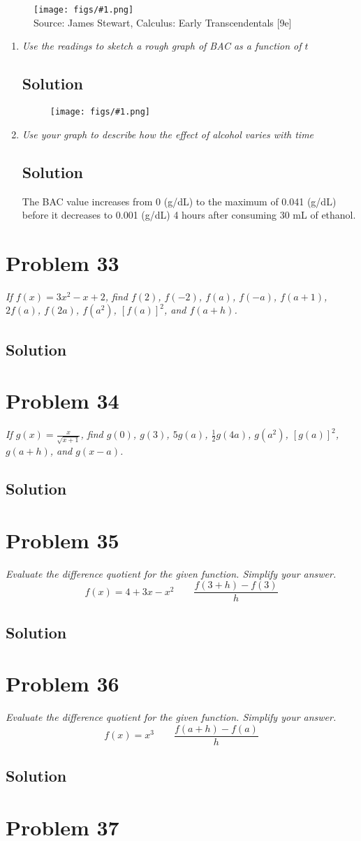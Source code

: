 \documentclass[11pt]{article}
\newcommand{\soln}{\subsection*}
\newcommand{\qn}{\textit}
\newcommand{\imagesource}[1]{{\footnotesize Source: #1}}
\newcommand{\imgqn}[1]{
	\begin{figure}[h]
		\centering
		\texttt{[image: figs/\#1.png]}\\
		\imagesource{James Stewart, Calculus: Early Transcendentals [9e]}
	\end{figure}
}
\newcommand{\imgsoln}[1]{
	\begin{figure}[h]
		\centering
		\texttt{[image: figs/\#1.png]}
	\end{figure}
}
\begin{document}
\imgqn{1.1.32}

\begin{enumerate}
	\item \qn{Use the readings to sketch a rough graph of BAC as a function of $t$}
	\soln{Solution}
	\imgsoln{1.1.32-ans.a}
	
	\item \qn{Use your graph to describe how the effect of alcohol varies with time}
	\soln{Solution}
	The BAC value increases from 0 (g/dL) to the maximum of 0.041 (g/dL) before it decreases to 0.001 (g/dL) 4 hours after consuming 30 mL of ethanol.
\end{enumerate}

\section*{Problem 33}

\qn{If $f(x)=3x^2-x+2$, find $f(2)$, $f(-2)$, $f(a)$, $f(-a)$, $f(a+1)$, $2f(a)$, $f(2a)$, $f(a^2)$, $[f(a)]^2$, and $f(a+h)$.}

\soln{Solution}

\section*{Problem 34}

\qn{If $g(x)=\frac{x}{\sqrt{x+1}}$, find $g(0)$, $g(3)$, $5g(a)$, $\frac{1}{2}g(4a)$, $g(a^2)$, $[g(a)]^2$, $g(a+h)$, and $g(x-a)$.}

\soln{Solution}

\section*{Problem 35}

\qn{Evaluate the difference quotient for the given function. Simplify your answer. $$f(x)=4+3x-x^2 \qquad \frac{f(3+h)-f(3)}{h}$$}

\soln{Solution}

\section*{Problem 36}

\qn{Evaluate the difference quotient for the given function. Simplify your answer. $$f(x)=x^3 \qquad \frac{f(a+h)-f(a)}{h}$$}

\soln{Solution}

\section*{Problem 37}
\end{document}
